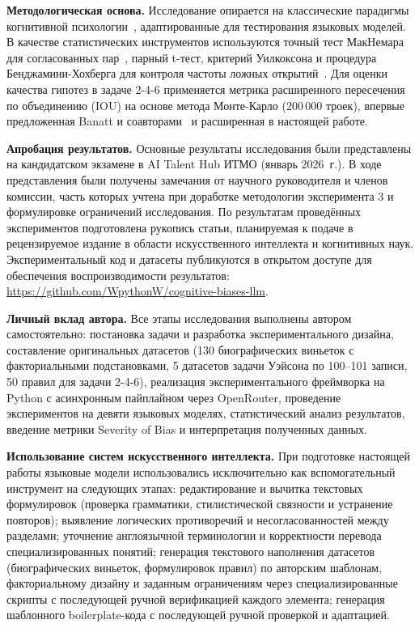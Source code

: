 \textbf{Методологическая основа.}
Исследование опирается на классические парадигмы когнитивной психологии~\cite{tversky1983extensional, wason1966reasoning, wason1960failure}, адаптированные для тестирования языковых моделей. В качестве статистических инструментов используются точный тест МакНемара для согласованных пар~\cite{mcnemar1947note}, парный t-тест, критерий Уилкоксона и процедура Бенджамини-Хохберга для контроля частоты ложных открытий~\cite{benjamini1995controlling}. Для оценки качества гипотез в задаче 2-4-6 применяется метрика расширенного пересечения по объединению (IOU) на основе метода Монте-Карло (200\,000 троек), впервые предложенная Banatt и соавторами~\cite{banatt2024wilt} и расширенная в настоящей работе.

\textbf{Апробация результатов.}
Основные результаты исследования были представлены на кандидатском экзамене в AI Talent Hub ИТМО (январь 2026~г.). В ходе представления были получены замечания от научного руководителя и членов комиссии, часть которых учтена при доработке методологии эксперимента 3 и формулировке ограничений исследования. По результатам проведённых экспериментов подготовлена рукопись статьи, планируемая к подаче в рецензируемое издание в области искусственного интеллекта и когнитивных наук. Экспериментальный код и датасеты публикуются в открытом доступе для обеспечения воспроизводимости результатов: \url{https://github.com/WpythonW/cognitive-biases-llm}.

\textbf{Личный вклад автора.}
Все этапы исследования выполнены автором самостоятельно: постановка задачи и разработка экспериментального дизайна, составление оригинальных датасетов (130 биографических виньеток с факториальными подстановками, 5 датасетов задачи Уэйсона по 100--101 записи, 50 правил для задачи 2-4-6), реализация экспериментального фреймворка на Python с асинхронным пайплайном через OpenRouter, проведение экспериментов на девяти языковых моделях, статистический анализ результатов, введение метрики Severity of Bias и интерпретация полученных данных.

\textbf{Использование систем искусственного интеллекта.}
При подготовке настоящей работы языковые модели использовались 
исключительно как вспомогательный инструмент на следующих этапах: 
редактирование и вычитка текстовых формулировок (проверка 
грамматики, стилистической связности и устранение повторов); 
выявление логических противоречий и несогласованностей между 
разделами; уточнение англоязычной терминологии и корректности 
перевода специализированных понятий; генерация текстового 
наполнения датасетов (биографических виньеток, формулировок 
правил) по авторским шаблонам, факториальному дизайну и 
заданным ограничениям через специализированные скрипты с 
последующей ручной верификацией каждого элемента; генерация 
шаблонного boilerplate-кода с последующей ручной проверкой 
и адаптацией.

